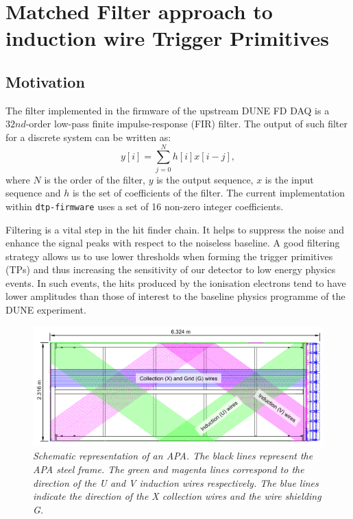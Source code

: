 \chapter{Matched Filter approach to induction wire Trigger Primitives}\label{chapter:matched_filter}

\section{Motivation}
\label{sec:2.1}

The filter implemented in the firmware of the upstream DUNE FD DAQ is a $32nd$-order low-pass finite impulse-response (FIR) filter. The output of such filter for a discrete system can be written as:
\begin{equation}\label{2.1.1}
	y[i] = \sum_{j=0}^{N} h[i] x[i-j],
\end{equation}
where $N$ is the order of the filter, $y$ is the output sequence, $x$ is the input sequence and $h$ is the set of coefficients of the filter. The current implementation within \texttt{dtp-firmware} \cite{dtp-firmware} uses a set of 16 non-zero integer coefficients.

Filtering is a vital step in the hit finder chain. It helps to suppress the noise and enhance the signal peaks with respect to the noiseless baseline. A good filtering strategy allows us to use lower thresholds when forming the trigger primitives (TPs) and thus increasing the sensitivity of our detector to low energy physics events. In such events, the hits produced by the ionisation electrons tend to have lower amplitudes than those of interest to the baseline 
physics programme of the DUNE experiment.

\begin{figure}[t]
	\centering
	\includegraphics[width=1\linewidth]{Images/Matched_Filter/APA_wires}
	\caption{\textit{Schematic representation of an APA. The black lines represent the APA steel frame. The green and magenta lines correspond to the direction of the U and V induction wires respectively. The blue lines indicate the direction of the X collection wires and the wire shielding G.}}
	\label{fig:apa}
\end{figure}


